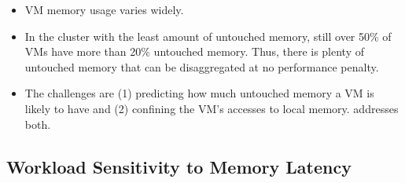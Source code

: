 \begin{itemize}

\item VM memory usage varies widely.
\item In the cluster with the least amount of untouched memory, still over
    50\% of VMs have more than 20\% untouched memory.  Thus, there is
        plenty of untouched memory that can be disaggregated at no
        performance penalty.
\item The challenges are (1) predicting how much untouched
        memory a VM is likely to have and (2) confining the VM's accesses
        to local memory. \sys addresses both. \border{}

\end{itemize}


%


\subsection{Workload Sensitivity to Memory Latency}
\label{sec-mot-cxl}



